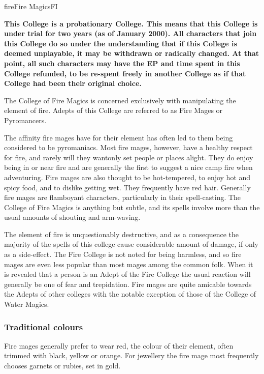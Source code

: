 \begin{college}[2.0]{fire}{Fire Magics}{FI}

\textbf{This College is a probationary College. This means that this
College is under trial for two years (as of January 2000). All
characters that join this College do so under the understanding that
if this College is deemed unplayable, it may be withdrawn or radically
changed. At that point, all such characters may have the EP and time
spent in this College refunded, to be re-spent freely in another
College as if that College had been their original choice.}

The College of Fire Magics is concerned exclusively with manipulating
the element of fire. Adepts of this College are referred to as Fire
Mages or Pyromancers.

The affinity fire mages have for their element has often led to them
being considered to be pyromaniacs. Most fire mages, however, have a
healthy respect for fire, and rarely will they wantonly set people or
places alight. They do enjoy being in or near fire and are generally
the first to suggest a nice camp fire when adventuring. Fire mages are
also thought to be hot-tempered, to enjoy hot and spicy food, and to
dislike getting wet. They frequently have red hair. Generally fire
mages are flamboyant characters, particularly in their
spell-casting. The College of Fire Magics is anything but subtle, and
its spells involve more than the usual amounts of shouting and
arm-waving.

The element of fire is unquestionably destructive, and as a
consequence the majority of the spells of this college cause
considerable amount of damage, if only as a side-effect. The Fire
College is not noted for being harmless, and so fire mages are even
less popular than most mages among the common folk. When it is
revealed that a person is an Adept of the Fire College the usual
reaction will generally be one of fear and trepidation. Fire mages are
quite amicable towards the Adepts of other colleges with the notable
exception of those of the College of Water Magics.

\subsubsection{Traditional colours}

Fire mages generally prefer to wear red, the colour of their element,
often trimmed with black, yellow or orange. For jewellery the fire
mage most frequently chooses garnets or rubies, set in gold.


\end{college}
